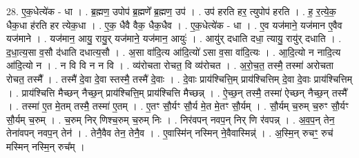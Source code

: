 \documentclass[17pt]{extarticle}
\begin{document}
28. ए॒क॒धेत्ये॑क - धा । . ब्र॒ह्मण॒ उपोप॑ ब्र॒ह्मणे᳚ ब्र॒ह्मण॒ उप॑ । . उप॑ हरति हर॒ त्युपोप॑ हरति । . ह॒ र॒त्ये॒क॒ धैक॒धा ह॑रति हर त्येक॒धा । . ए॒क॒ धैवै वैक॒ धैक॒धैव । . ए॒क॒धेत्ये॑क - धा । . ए॒व यज॑माने॒ यज॑मान ए॒वैव यज॑माने । . यज॑मान॒ आयु॒ रायु॒र् यज॑माने॒ यज॑मान॒ आयुः॑ । . आयु॑र् दधाति दधा॒ त्यायु॒ रायु॑र् दधाति । . द॒धा॒त्य॒सा व॒सौ द॑धाति दधात्य॒सौ । . अ॒सा वा॑दि॒त्य आ॑दि॒त्यो॑ ऽसा व॒सा वा॑दि॒त्यः । . आ॒दि॒त्यो न नादि॒त्य आ॑दि॒त्यो न । . न वि वि न न वि । . व्य॑रोचता रोचत॒ वि व्य॑रोचत । . अ॒रो॒च॒त॒ तस्मै॒ तस्मा॑ अरोचता रोचत॒ तस्मै᳚ । . तस्मै॑ दे॒वा दे॒वा स्तस्मै॒ तस्मै॑ दे॒वाः । . दे॒वाः प्राय॑श्चित्ति॒म् प्राय॑श्चित्तिम् दे॒वा दे॒वाः प्राय॑श्चित्तिम् । . प्राय॑श्चित्ति मैच्छन् नैच्छ॒न् प्राय॑श्चित्ति॒म् प्राय॑श्चित्ति मैच्छन्न् । . ऐ॒च्छ॒न् तस्मै॒ तस्मा॑ ऐच्छन् नैच्छ॒न् तस्मै᳚ । . तस्मा॑ ए॒त मे॒तम् तस्मै॒ तस्मा॑ ए॒तम् । . ए॒तꣳ सौ॒र्यꣳ सौ॒र्य मे॒त मे॒तꣳ सौ॒र्यम् । . सौ॒र्यम् च॒रुम् च॒रुꣳ सौ॒र्यꣳ सौ॒र्यम् च॒रुम् । . च॒रुम् निर् णिश्च॒रुम् च॒रुम् निः । . निर॑वपन् नवप॒न् निर् णि र॑वपन्न् । . अ॒व॒प॒न् तेन॒ तेना॑वपन् नवप॒न् तेन॑ । . तेनै॒वैव तेन॒ तेनै॒व । . ए॒वास्मि॑न् नस्मिन् ने॒वैवास्मिन्न्॑ । . अ॒स्मि॒न् रुचꣳ॒॒ रुच॑ मस्मिन् नस्मि॒न् रुच᳚म् । \newline
\end{document}
